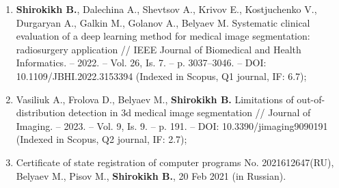 \begin{enumerate}
    \item \textbf{Shirokikh B.}, Dalechina A., Shevtsov A., Krivov E., Kostjuchenko V., Durgaryan A., Galkin M., Golanov A., Belyaev M. Systematic clinical evaluation of a deep learning method for medical image segmentation: radiosurgery application // IEEE Journal of Biomedical and Health Informatics. -- 2022. -- Vol. 26, Is. 7. -- p. 3037--3046. -- DOI: 10.1109/JBHI.2022.3153394 (Indexed in Scopus, Q1 journal, IF: 6.7);
    
    \item Vasiliuk A., Frolova D., Belyaev M., \textbf{Shirokikh B.} Limitations of out-of-distribution detection in 3d medical image segmentation // Journal of Imaging. -- 2023. -- Vol. 9, Is. 9. -- p. 191. -- DOI: 10.3390/jimaging9090191 (Indexed in Scopus, Q2 journal, IF: 2.7);
    
    \item Certificate of state registration of computer programs No. 2021612647(RU), Belyaev M., Pisov M., \textbf{Shirokikh B.}, 20 Feb 2021 (in Russian).
        
\end{enumerate}

    


\printbibliography[heading=subbibliography]